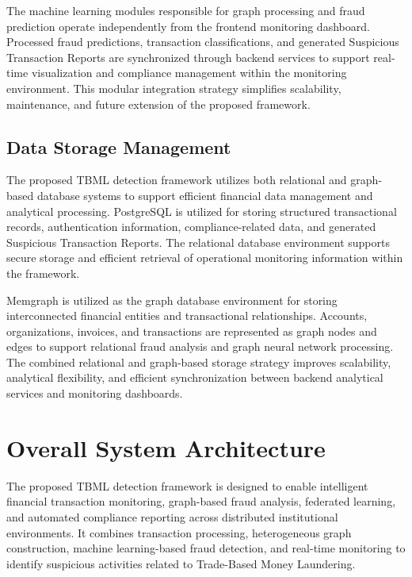 The machine learning modules responsible for graph processing and fraud prediction operate independently from the frontend monitoring dashboard. Processed fraud predictions, transaction classifications, and generated Suspicious Transaction Reports are synchronized through backend services to support real-time visualization and compliance management within the monitoring environment. This modular integration strategy simplifies scalability, maintenance, and future extension of the proposed framework.


\subsection[Data Storage Management]{\textbf{Data Storage Management}}

The proposed TBML detection framework utilizes both relational and graph-based database systems to support efficient financial data management and analytical processing. PostgreSQL is utilized for storing structured transactional records, authentication information, compliance-related data, and generated Suspicious Transaction Reports. The relational database environment supports secure storage and efficient retrieval of operational monitoring information within the framework.

Memgraph is utilized as the graph database environment for storing interconnected financial entities and transactional relationships. Accounts, organizations, invoices, and transactions are represented as graph nodes and edges to support relational fraud analysis and graph neural network processing. The combined relational and graph-based storage strategy improves scalability, analytical flexibility, and efficient synchronization between backend analytical services and monitoring dashboards.

\section[Overall System Architecture]{\textbf{Overall System Architecture}}

The proposed TBML detection framework is designed to enable intelligent financial transaction monitoring, graph-based fraud analysis, federated learning, and automated compliance reporting across distributed institutional environments. It combines transaction processing, heterogeneous graph construction, machine learning-based fraud detection, and real-time monitoring to identify suspicious activities related to Trade-Based Money Laundering.

